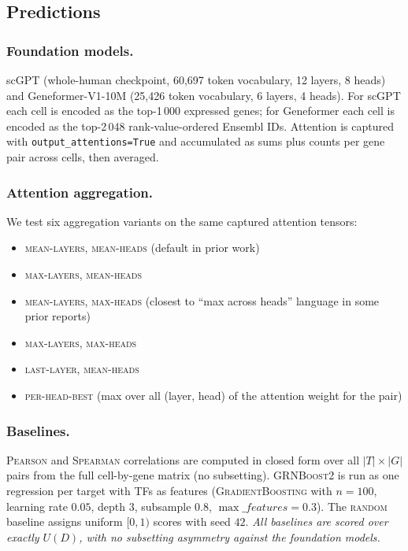 \documentclass[sigconf]{acmart}
\begin{document}
\subsection{Predictions}

\subsubsection*{Foundation models.} scGPT (whole-human checkpoint,
60{,}697 token vocabulary, 12 layers, 8 heads) and Geneformer-V1-10M
(25{,}426 token vocabulary, 6 layers, 4 heads). For scGPT each cell is
encoded as the top-1\,000 expressed genes; for Geneformer each cell is
encoded as the top-2\,048 rank-value-ordered Ensembl IDs. Attention is
captured with \texttt{output\_attentions=True} and accumulated as
sums plus counts per gene pair across cells, then averaged.

\subsubsection*{Attention aggregation.} We test six aggregation variants
on the same captured attention tensors:
\begin{itemize}
\item \textsc{mean-layers, mean-heads} (default in prior work)
\item \textsc{max-layers, mean-heads}
\item \textsc{mean-layers, max-heads} (closest to ``max across heads''
language in some prior reports)
\item \textsc{max-layers, max-heads}
\item \textsc{last-layer, mean-heads}
\item \textsc{per-head-best} (max over all (layer, head) of the
attention weight for the pair)
\end{itemize}

\subsubsection*{Baselines.}
\textsc{Pearson} and \textsc{Spearman} correlations are computed in
closed form over all $|T| \times |G|$ pairs from the full
cell-by-gene matrix (no subsetting). \textsc{GRNBoost2} is run as
one regression per target with TFs as features
(\textsc{GradientBoosting} with $n=100$, learning rate $0.05$, depth
$3$, subsample $0.8$, $\max\_features=0.3$). The \textsc{random}
baseline assigns uniform $[0, 1)$ scores with seed $42$. \emph{All
baselines are scored over exactly $U(D)$, with no subsetting asymmetry
against the foundation models.}
\end{document}
